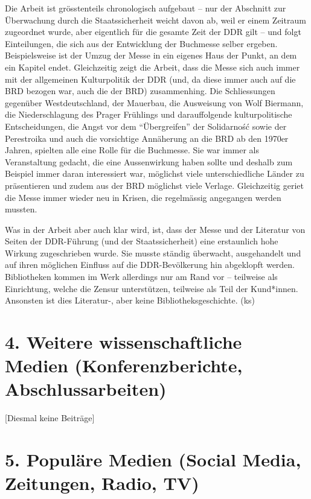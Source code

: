 \documentclass[a4paper,
fontsize=11pt,
oneside,
numbers=noperiodatend,
parskip=half-,
bibliography=totoc,
final
]{scrartcl}
\begin{document}
Die Arbeit ist grösstenteils chronologisch aufgebaut -- nur der
Abschnitt zur Überwachung durch die Staatssicherheit weicht davon ab,
weil er einem Zeitraum zugeordnet wurde, aber eigentlich für die gesamte
Zeit der DDR gilt -- und folgt Einteilungen, die sich aus der
Entwicklung der Buchmesse selber ergeben. Beispielsweise ist der Umzug
der Messe in ein eigenes Haus der Punkt, an dem ein Kapitel endet.
Gleichzeitig zeigt die Arbeit, dass die Messe sich auch immer mit der
allgemeinen Kulturpolitik der DDR (und, da diese immer auch auf die BRD
bezogen war, auch die der BRD) zusammenhing. Die Schliessungen gegenüber
Westdeutschland, der Mauerbau, die Ausweisung von Wolf Biermann, die
Niederschlagung des Prager Frühlings und darauffolgende kulturpolitische
Entscheidungen, die Angst vor dem \enquote{Übergreifen} der Solidarność sowie
der Perestroika und auch die vorsichtige Annäherung an die BRD ab den
1970er Jahren, spielten alle eine Rolle für die Buchmesse. Sie war immer
als Veranstaltung gedacht, die eine Aussenwirkung haben sollte und
deshalb zum Beispiel immer daran interessiert war, möglichst viele
unterschiedliche Länder zu präsentieren und zudem aus der BRD möglichst
viele Verlage. Gleichzeitig geriet die Messe immer wieder neu in Krisen,
die regelmässig angegangen werden mussten.

Was in der Arbeit aber auch klar wird, ist, dass der Messe und der
Literatur von Seiten der DDR-Führung (und der Staatssicherheit) eine
erstaunlich hohe Wirkung zugeschrieben wurde. Sie musste ständig
überwacht, ausgehandelt und auf ihren möglichen Einfluss auf die
DDR-Bevölkerung hin abgeklopft werden. Bibliotheken kommen im Werk
allerdings nur am Rand vor -- teilweise als Einrichtung, welche die
Zensur unterstützen, teilweise als Teil der Kund*innen. Ansonsten ist
dies Literatur-, aber keine Bibliotheksgeschichte. (ks)

\section{4. Weitere wissenschaftliche Medien (Konferenzberichte,
Abschlussarbeiten)}\label{weitere-wissenschaftliche-medien-konferenzberichte-abschlussarbeiten}

{[}Diesmal keine Beiträge{]}

\section{5. Populäre Medien (Social Media, Zeitungen, Radio,
TV)}\label{populuxe4re-medien-social-media-zeitungen-radio-tv}
\end{document}
